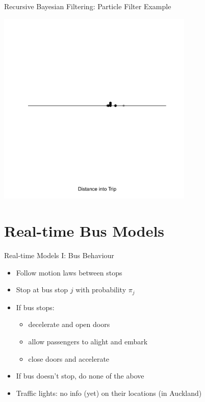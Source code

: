 \documentclass[10pt,t]{beamer}
\begin{document}
\begin{frame}{Recursive Bayesian Filtering: Particle Filter Example}
\begin{overprint}
    \centering
    \includegraphics[width=0.7\textwidth]{figs/pf2-frame7.pdf}
  \end{overprint}
  \onslide<+->
\end{frame}


\section{Real-time Bus Models}

\begin{frame}{Real-time Models I: Bus Behaviour}
  \onslide<+->
  \begin{itemize}[<+->]
  \item Follow motion laws between stops
  \item Stop at bus stop $j$ with probability $\pi_j$
  \item If bus stops:
    \begin{itemize}[<1->]
    \item decelerate and open doors
    \item allow passengers to alight and embark
    \item close doors and accelerate
    \end{itemize}
  \item If bus doesn't stop, do none of the above
  \item Traffic lights: no info (yet) on their locations (in Auckland)
  \end{itemize}
\end{frame}
\end{document}
